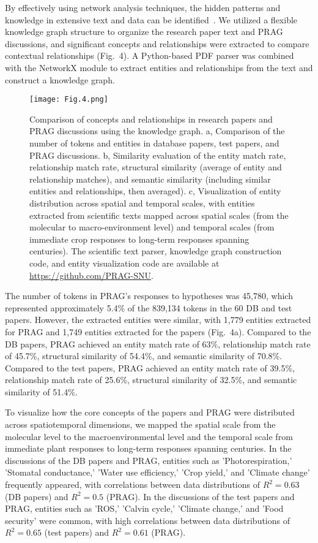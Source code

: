 \documentclass[12pt]{article}
\begin{document}
By effectively using network analysis techniques, the hidden patterns and knowledge in extensive text and data can be identified~\cite{ref20}. We utilized a flexible knowledge graph structure to organize the research paper text and PRAG discussions, and significant concepts and relationships were extracted to compare contextual relationships (Fig.~4). A Python-based PDF parser was combined with the NetworkX module to extract entities and relationships from the text and construct a knowledge graph.
\begin{figure}
    \centering
    \texttt{[image: Fig.4.png]}
    \caption{Comparison of concepts and relationships in research papers and PRAG discussions using the knowledge graph. a, Comparison of the number of tokens and entities in database papers, test papers, and PRAG discussions. b, Similarity evaluation of the entity match rate, relationship match rate, structural similarity (average of entity and relationship matches), and semantic similarity (including similar entities and relationships, then averaged). c, Visualization of entity distribution across spatial and temporal scales, with entities extracted from scientific texts mapped across spatial scales (from the molecular to macro-environment level) and temporal scales (from immediate crop responses to long-term responses spanning centuries). The scientific text parser, knowledge graph construction code, and entity visualization code are available at \url{https://github.com/PRAG-SNU}.
    }
    \label{fig:prag}
\end{figure}
The number of tokens in PRAG's responses to hypotheses was 45,780, which represented approximately 5.4\% of the 839,134 tokens in the 60 DB and test papers. However, the extracted entities were similar, with 1,779 entities extracted for PRAG and 1,749 entities extracted for the papers (Fig.~4a). Compared to the DB papers, PRAG achieved an entity match rate of 63\%, relationship match rate of 45.7\%, structural similarity of 54.4\%, and semantic similarity of 70.8\%. Compared to the test papers, PRAG achieved an entity match rate of 39.5\%, relationship match rate of 25.6\%, structural similarity of 32.5\%, and semantic similarity of 51.4\%.

To visualize how the core concepts of the papers and PRAG were distributed across spatiotemporal dimensions, we mapped the spatial scale from the molecular level to the macroenvironmental level and the temporal scale from immediate plant responses to long-term responses spanning centuries. In the discussions of the DB papers and PRAG, entities such as 'Photorespiration,' 'Stomatal conductance,' 'Water use efficiency,' 'Crop yield,' and 'Climate change' frequently appeared, with correlations between data distributions of $R^2 = 0.63$ (DB papers) and $R^2 = 0.5$ (PRAG). In the discussions of the test papers and PRAG, entities such as 'ROS,' 'Calvin cycle,' 'Climate change,' and 'Food security' were common, with high correlations between data distributions of $R^2 = 0.65$ (test papers) and $R^2 = 0.61$ (PRAG).
\end{document}
